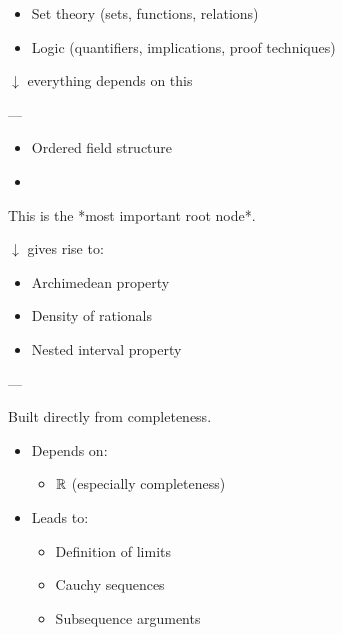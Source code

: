 \documentclass[12pt,a4paper]{report}
\begin{document}
\begin{description}
\item {}

		\begin{itemize}
        \item Set theory (sets, functions, relations)
        \item Logic (quantifiers, implications, proof techniques)
		\end{itemize}

$\downarrow$ everything depends on this

---

\item {}

		\begin{itemize}
        \item Ordered field structure
        \item {}
		\end{itemize}

This is the *most important root node*.

$\downarrow$ gives rise to:

		\begin{itemize}
        \item Archimedean property
        \item Density of rationals
        \item Nested interval property
		\end{itemize}

---

\item {}

Built directly from completeness.

	\begin{itemize}
    \item Depends on:

		\begin{itemize}
        \item $\mathbb{R}$ (especially completeness)
		\end{itemize}

    \item Leads to:

		\begin{itemize}
        \item Definition of limits
        \item Cauchy sequences
        \item Subsequence arguments
		\end{itemize}


\end{itemize}
\end{description}
\end{document}
